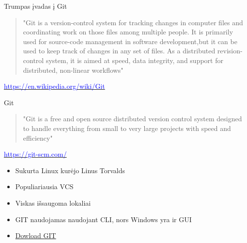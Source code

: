 \documentclass[11pt,xcolor=table]{beamer}
\begin{document}
\begin{frame}{Trumpas įvadas į Git}
\begin{quote}
"Git is a version-control system for tracking changes in computer files and coordinating work on those files among multiple people. It is primarily used for source-code management in software development,but it can be used to keep track of changes in any set of files. As a distributed revision-control system, it is aimed at speed, data integrity, and support for distributed, non-linear workflows"
\end{quote}
\href{https://en.wikipedia.org/wiki/Git}{\textcolor{blue}{https://en.wikipedia.org/wiki/Git}}
\end{frame}
\begin{frame}{Git}
\begin{quote}
"Git is a free and open source distributed version control system designed to handle everything from small to very large projects with speed and efficiency"
\end{quote}
\href{https://git-scm.com/}{\textcolor{blue}{https://git-scm.com/}}
\begin{itemize}
\item Sukurta Linux kurėjo Linus Torvalds
\item Populiariausia VCS
\item Viskas išsaugoma lokaliai
\item GIT naudojamas naudojant CLI, nors Windows yra ir GUI
\item \href{http://git-scm.com/downloads}{\color{blue}Dowload GIT}
\end{itemize}
\end{frame}
\end{document}
